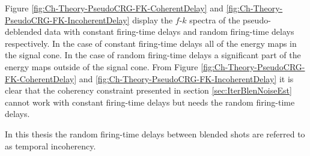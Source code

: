 Figure \ref{fig:Ch-Theory-PseudoCRG-FK-CoherentDelay} and \ref{fig:Ch-Theory-PseudoCRG-FK-IncoherentDelay} display the $f$-$k$ spectra of the pseudo-deblended data with constant firing-time delays and random firing-time delays respectively. In the case of constant firing-time delays all of the energy maps in the signal cone. In the case of random firing-time delays a significant part of the energy maps outside of the signal cone. From Figure \ref{fig:Ch-Theory-PseudoCRG-FK-CoherentDelay} and \ref{fig:Ch-Theory-PseudoCRG-FK-IncoherentDelay} it is clear that the coherency constraint presented in section \ref{sec:IterBlenNoiseEst} cannot work with constant firing-time delays but needs the random firing-time delays. 

In this thesis the random firing-time delays between blended shots are referred to as temporal incoherency.  

